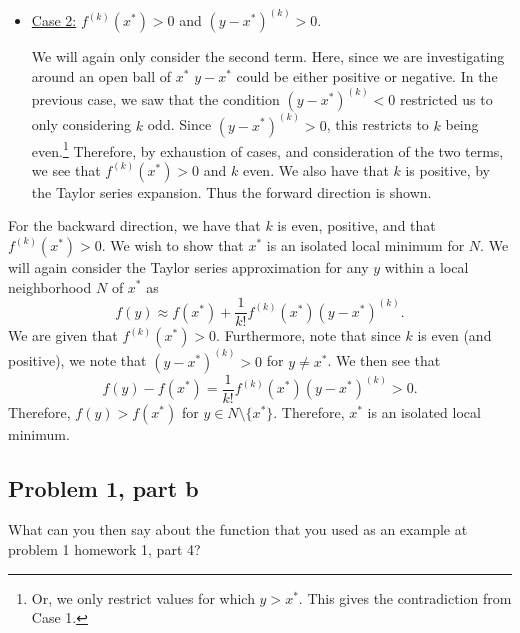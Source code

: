 \begin{solution}
\begin{itemize}
         \item \underline{Case 2:} $f^{(k)}(x^*) > 0$ and $(y - x^*)^{(k)} > 0$.

         \jump
         We will again only consider the second term. Here, since we are investigating around an open ball of $x^*$ $y - x^*$ could be either positive or negative. In the previous case, we saw that the condition $(y - x^*)^{(k)} < 0$ restricted us to only considering $k$ odd. Since $(y - x^*)^{(k)} > 0$, this restricts to $k$ being even.\footnote{Or, we only restrict values for which $y > x^*$. This gives the contradiction from Case 1.} Therefore, by exhaustion of cases, and consideration of the two terms, we see that $f^{(k)}(x^*) > 0$ and $k$ even. We also have that $k$ is positive, by the Taylor series expansion. Thus the forward direction is shown.
     \end{itemize}

     \jump
     For the backward direction, we have that $k$ is even, positive, and that $f^{(k)}(x^*) > 0$. We wish to show that $x^*$ is an isolated local minimum for $N$. We will again consider the Taylor series approximation for any $y$ within a local neighborhood $N$ of $x^*$ as 
     \[f(y) \approx f(x^*) + \frac{1}{k!}f^{(k)}(x^*)(y - x^*)^{(k)}.\]
     We are given that $f^{(k)}(x^*) > 0$. Furthermore, note that since $k$ is even (and positive), we note that $(y - x^*)^{(k)} > 0$ for $y \neq x^*$. We then see that  
     \[f(y) - f(x^*) = \frac{1}{k!}f^{(k)}(x^*)(y - x^*)^{(k)} > 0.\]
     Therefore, $f(y) > f(x^*)$ for $y \in N\setminus\{x^*\}$. Therefore, $x^*$ is an isolated local minimum. 
\end{solution}
\newpage
\subsection{Problem 1, part b}
What can you then say about the function that you used as an example at problem 1 homework 1, part 4?
\partbreak
\begin{solution}
    
\end{solution}

\newpage
